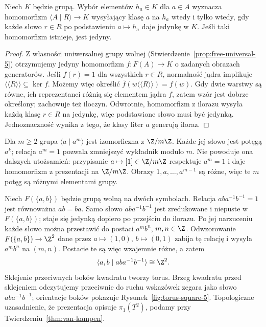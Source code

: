 \begin{stwierdzenie}
\label{prop:presentation-universal-5}
Niech $K$ będzie grupą. Wybór elementów $h_a\in K$ dla $a\in A$
wyznacza homomorfizm $\langle A\mid R\rangle\to K$ wysyłający
klasę $a$ na $h_a$ wtedy i tylko wtedy, gdy każde słowo $r\in R$
po podstawieniu $a\mapsto h_a$ daje jedynkę w $K$.
Jeśli taki homomorfizm istnieje, jest jedyny.
\end{stwierdzenie}
\begin{proof}
Z własności uniwersalnej grupy wolnej
(Stwierdzenie~\ref{prop:free-universal-5}) otrzymujemy jedyny
homomorfizm $f:F(A)\to K$ o zadanych obrazach generatorów.
Jeśli $f(r)=1$ dla wszystkich $r\in R$, normalność jądra
implikuje $\langle\!\langle R\rangle\!\rangle\subseteq\ker f$.
Możemy więc określić
$\bar f(w\langle\!\langle R\rangle\!\rangle)=f(w)$.
Gdy dwie warstwy są równe, ich reprezentanci różnią się elementem
jądra $f$, zatem wzór jest dobrze określony; zachowuje też iloczyn.
Odwrotnie, homomorfizm z ilorazu wysyła każdą klasę $r\in R$
na jedynkę, więc podstawione słowo musi być jedynką.
Jednoznaczność wynika z tego, że klasy liter $a$ generują iloraz.
\end{proof}

\begin{przyklad}
\label{prz:cyclic-presentation-5}
Dla $m\geq2$ grupa $\langle a\mid a^m\rangle$ jest izomorficzna
z $\Z/m\Z$. Każde jej słowo jest potęgą $a^k$;
relacja $a^m=1$ pozwala zmniejszyć wykładnik modulo $m$.
Nie powoduje ona dalszych utożsamień: przypisanie
$a\mapsto[1]\in\Z/m\Z$ respektuje $a^m=1$ i daje homomorfizm
z prezentacji na $\Z/m\Z$. Obrazy $1,a,\ldots,a^{m-1}$ są różne,
więc te $m$ potęg są różnymi elementami grupy.
\end{przyklad}

\begin{przyklad}
\label{prz:prezentacja-torusa-5}
Niech $F(\{a,b\})$ będzie grupą wolną
na dwóch symbolach. Relacja
$aba^{-1}b^{-1}=1$
jest równoważna $ab=ba$.
Samo słowo $aba^{-1}b^{-1}$ jest zredukowane i niepuste
w $F(\{a,b\})$; staje się jedynką dopiero po przejściu do ilorazu.
Po jej narzuceniu każde słowo
można przestawić do postaci
$a^m b^n$, $m,n\in\Z$.
Odwzorowanie
$F(\{a,b\})\to\Z^2$ dane przez
$a\mapsto(1,0)$,
$b\mapsto(0,1)$
zabija tę relację i wysyła
$a^m b^n$ na $(m,n)$.
Postacie te są więc wzajemnie
różne, a zatem
\[
 \langle a,b\mid aba^{-1}b^{-1}\rangle
 \cong\Z^2.
\]
Sklejenie przeciwnych boków kwadratu
tworzy torus. Brzeg kwadratu przed
sklejeniem odczytujemy przeciwnie do ruchu wskazówek zegara
jako słowo $aba^{-1}b^{-1}$; orientacje boków
pokazuje Rysunek~\ref{fig:torus-square-5}.
Topologiczne uzasadnienie, że
prezentacja opisuje $\pi_1(T^2)$,
podamy przy
Twierdzeniu~\ref{thm:van-kampen}.
\end{przyklad}

